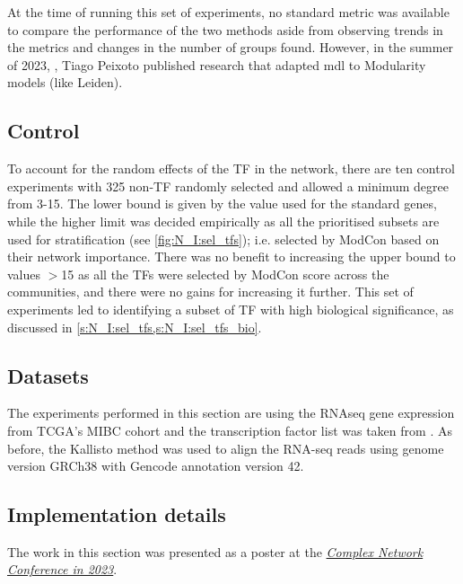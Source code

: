 At the time of running this set of experiments, no standard metric was available to compare the performance of the two methods aside from observing trends in the metrics and changes in the number of groups found. However, in the summer of 2023, \cite{Peixoto2023-se}, Tiago Peixoto published research that adapted \acrshort{mdl} to Modularity models (like Leiden).

\subsection*{Control}

To account for the random effects of the TF in the network, there are ten control experiments with 325 non-TF randomly selected and allowed a minimum degree from 3-15. The lower bound is given by the value used for the standard genes, while the higher limit was decided empirically as all the prioritised subsets are used for stratification (see \cref{fig:N_I:sel_tfs}); i.e. selected by ModCon based on their network importance. There was no benefit to increasing the upper bound to values $>$15 as all the TFs were selected by ModCon score across the communities, and there were no gains for increasing it further. This set of experiments led to identifying a subset of TF with high biological significance, as discussed in \cref{s:N_I:sel_tfs,s:N_I:sel_tfs_bio}.

\subsection*{Datasets}

The experiments performed in this section are using the RNAseq gene expression from TCGA's MIBC cohort and the transcription factor list was taken from \citet{Lambert2018-el}. As before, the Kallisto method was used to align the RNA-seq reads using genome version GRCh38 with Gencode annotation version 42. 

\subsection*{Implementation details}

The work in this section was presented as a poster at the \textit{\href{https://2023.complexnetworks.org/}{Complex Network Conference in 2023}}.



